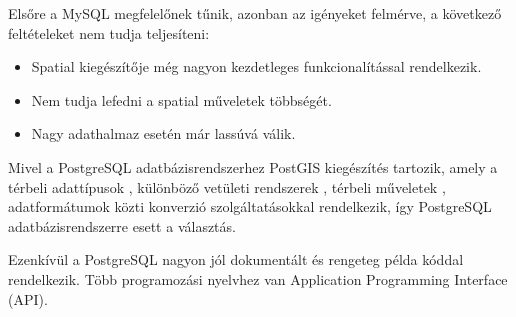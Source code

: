   Elsőre a MySQL megfelelőnek tűnik, azonban az igényeket felmérve, a következő feltételeket nem tudja teljesíteni:
  \begin{itemize}
    \item Spatial kiegészítője még nagyon kezdetleges funkcionalítással rendelkezik.
    \item Nem tudja lefedni a spatial műveletek többségét.
    \item Nagy adathalmaz esetén már lassúvá válik.
  \end{itemize}
  Mivel a PostgreSQL adatbázisrendszerhez PostGIS kiegészítés tartozik, amely a térbeli adattípusok , különböző vetületi rendszerek , térbeli műveletek , adatformátumok közti konverzió szolgáltatásokkal rendelkezik, így PostgreSQL adatbázisrendszerre esett a választás.
  
  
  Ezenkívül a PostgreSQL nagyon jól dokumentált és rengeteg példa kóddal rendelkezik.
  Több programozási nyelvhez van Application Programming Interface (API).
  

